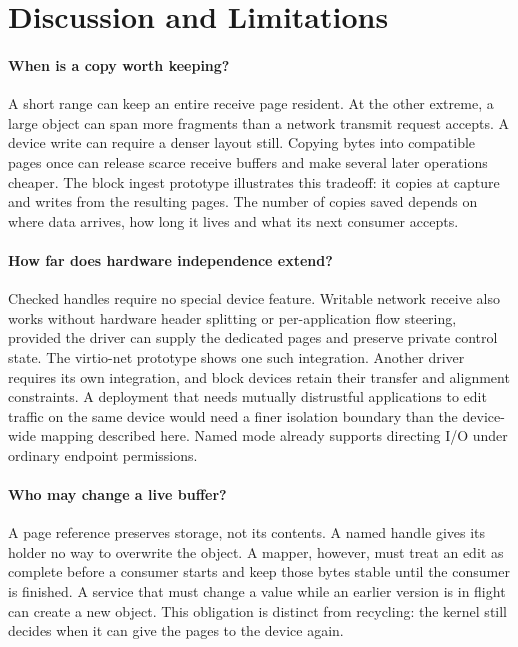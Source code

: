\section{Discussion and Limitations}
\label{sec:discussion}

\paragraph{When is a copy worth keeping?} A short range can keep an entire
receive page resident. At the other extreme, a large object can span more
fragments than a network transmit request accepts. A device write can require
a denser layout still. Copying bytes into compatible pages once can release
scarce receive buffers and make several later operations cheaper. The block
ingest prototype illustrates this tradeoff: it copies at capture and writes
from the resulting pages. The number of copies saved depends on where data
arrives, how long it lives and what its next consumer accepts.

\paragraph{How far does hardware independence extend?} Checked handles
require no special device feature. Writable network receive also works without
hardware header splitting or per-application flow steering, provided the driver
can supply the dedicated pages and preserve private control state. The
virtio-net prototype shows one such integration. Another driver requires its
own integration, and block devices retain their transfer and alignment
constraints. A deployment that needs mutually distrustful applications to edit
traffic on the same device would need a finer isolation boundary than the
device-wide mapping described here. Named mode already supports directing I/O
under ordinary endpoint permissions.

\paragraph{Who may change a live buffer?} A page reference preserves storage,
not its contents. A named handle gives its holder no way to overwrite the
object. A mapper, however, must treat an edit as complete before a consumer
starts and keep those bytes stable until the consumer is finished. A service
that must change a value while an earlier version is in flight can create a
new object. This obligation is distinct from recycling: the kernel still
decides when it can give the pages to the device again.

